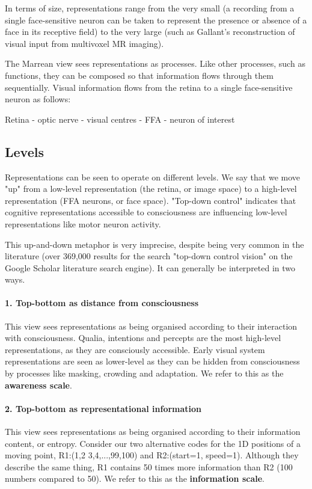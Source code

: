 In terms of size, representations range from the very small (a recording from a single face-sensitive neuron can be taken to represent the presence or absence of a face in its receptive field) to the very large (such as Gallant's reconstruction of visual input from multivoxel MR imaging\cite{naselaris2009bayesian}).

The Marrean view sees representations as processes. Like other processes, such as functions, they can be composed so that information flows through them sequentially. Visual information flows from the retina to a single face-sensitive neuron as follows:

Retina - optic nerve - visual centres - FFA - neuron of interest

\subsection{Levels}

Representations can be seen to operate on different levels. We say that we move "up" from a low-level representation (the retina, or image space) to a high-level representation (FFA neurons, or face space). "Top-down control" indicates that cognitive representations accessible to consciousness are influencing low-level representations like motor neuron activity.

This up-and-down metaphor is very imprecise, despite being very common in the literature (over 369,000 results for the search "top-down control vision" on the Google Scholar literature search engine). It can generally be interpreted in two ways.

\paragraph{1. Top-bottom as distance from consciousness}
This view sees representations as being organised according to their interaction with consciousness. Qualia, intentions and percepts are the most high-level representations, as they are consciously accessible. Early visual system representations are seen as lower-level as they can be hidden from consciousness by processes like masking, crowding and adaptation. We refer to this as the \textbf{awareness scale}.

\paragraph{2. Top-bottom as representational information}
This view sees representations as being organised according to their information content, or entropy. Consider our two alternative codes for the 1D positions of a moving point, R1:(1,2 3,4,...,99,100) and R2:(start=1, speed=1). Although they describe the same thing, R1 contains 50 times more information than R2 (100 numbers compared to 50). We refer to this as the \textbf{information scale}.

